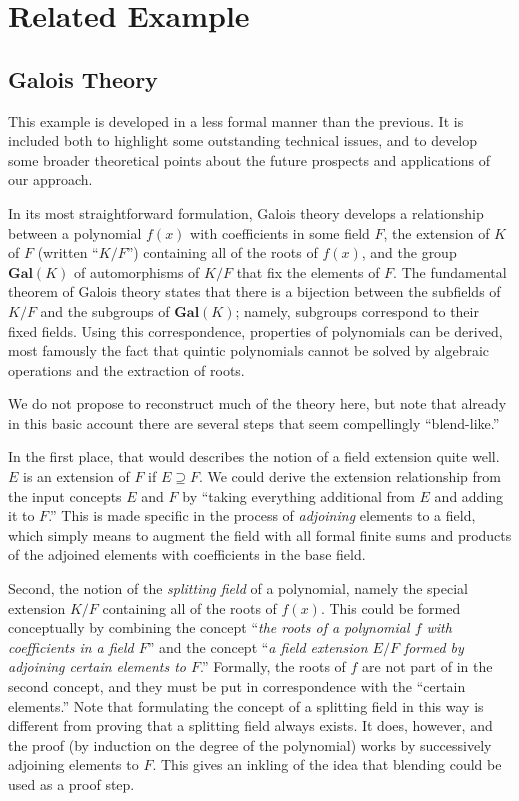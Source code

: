 \section{Related Example} \label{galois}

\subsection{Galois Theory}

This example is developed in a less formal manner than the previous.
It is included both to highlight some outstanding technical issues,
and to develop some broader theoretical points about the future
prospects and applications of our approach.  

In its most straightforward formulation, Galois theory develops a
relationship between a polynomial $f(x)$ with coefficients in some
field $F$, the extension of $K$ of $F$ (written ``$K/F$'') containing
all of the roots of $f(x)$, and the group $\mathbf{Gal}(K)$ of
automorphisms of $K/F$ that fix the elements of $F$.  The fundamental
theorem of Galois theory states that there is a bijection between the
subfields of $K/F$ and the subgroups of $\mathbf{Gal}(K)$;
namely, subgroups correspond to their fixed fields.  Using this
correspondence, properties of polynomials can be derived, most
famously the fact that quintic polynomials cannot be solved by
algebraic operations and the extraction of roots.  

We do not propose to reconstruct much of the theory here, but note
that already in this basic account there are several steps that seem
compellingly ``blend-like.''

In the first place, that would describes the notion of a field
extension quite well.  $E$ is an extension of $F$ if $E \supseteq F$.
We could derive the extension relationship from the input concepts $E$
and $F$ by ``taking everything additional from $E$ and adding it to
$F$.''  This is made specific in the process of \emph{adjoining}
elements to a field, which simply means to augment the field with all
formal finite sums and products of the adjoined elements with
coefficients in the base field.

Second, the notion of the \emph{splitting field} of a polynomial,
namely the special extension $K/F$ containing all of the roots of
$f(x)$.  This could be formed conceptually by combining the concept
``\emph{the roots of a polynomial $f$ with coefficients in a field
  $F$}'' and the concept ``\emph{a field extension $E/F$ formed by
  adjoining certain elements to $F$}.''  Formally, the roots of $f$
are not part of in the second concept, and they must be put in
correspondence with the ``certain elements.''  Note that formulating
the concept of a splitting field in this way is different from proving
that a splitting field always exists.  It does, however, and the proof
(by induction on the degree of the polynomial) works by successively
adjoining elements to $F$.  This gives an inkling of the idea that
blending could be used as a proof step.

